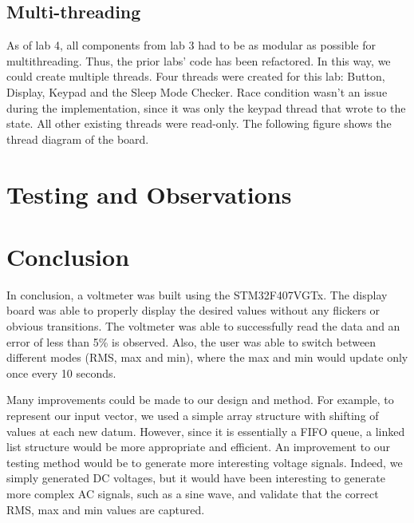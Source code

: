 \documentclass[a4paper,titlepage]{article}
\begin{document}
\subsection{Multi-threading}
As of lab 4, all components from lab 3 had to be as modular as possible for multithreading. Thus, the prior labs' code has been refactored. In this way, we could create multiple threads. Four threads were created for this lab: Button, Display, Keypad and the Sleep Mode Checker. Race condition wasn't an issue during the implementation, since it was only the keypad thread that wrote to the state. All other existing threads were read-only.  The following figure shows the thread diagram of the board.


\section{Testing and Observations}

\section{Conclusion}
In conclusion, a voltmeter was built using the STM32F407VGTx. The display board was able to properly display the desired values without any flickers or obvious transitions. The voltmeter was able to successfully read the data and an error of less than 5\% is observed. Also, the user was able to switch between different modes (RMS, max and min), where the max and min would update only once every 10 seconds.

Many improvements could be made to our design and method. For example, to represent our input vector, we used a simple array structure with shifting of values at each new datum. However, since it is essentially a FIFO queue, a linked list structure would be more appropriate and efficient. An improvement to our testing method would be to generate more interesting voltage signals. Indeed, we simply generated DC voltages, but it would have been interesting to generate more complex AC signals, such as a sine wave, and validate that the correct RMS, max and min values are captured.


\end{document}
